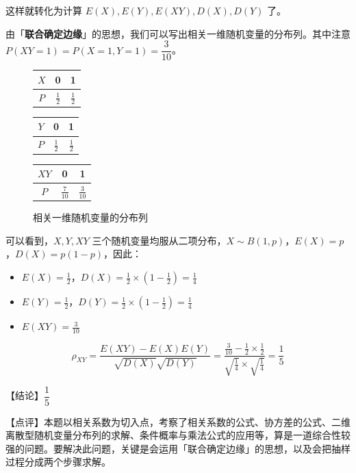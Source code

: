 \documentclass[UTF8]{ctexart}
\begin{document}
这样就转化为计算 $E(X),E(Y),E(XY),D(X),D(Y)$ 了。

由「\textbf{联合确定边缘}」的思想，我们可以写出相关一维随机变量的分布列。其中注意 $P(XY=1) = P(X=1,Y=1) = \dfrac3{10}$。

\begin{figure}[htb]
\begin{minipage}[t]{.32\textwidth}
    \centering
    \begin{tabular}{ccc}
    \toprule
        $X$ & 0 & 1 \\
    \midrule
        $P$ & $\frac12$ & $\frac12$ \\
    \bottomrule
    \end{tabular}
\end{minipage}
\begin{minipage}[t]{.32\textwidth}
    \centering
    \begin{tabular}{ccc}
    \toprule
        $Y$ & 0 & 1 \\
    \midrule
        $P$ & $\frac12$ & $\frac12$ \\
    \bottomrule
    \end{tabular}
\end{minipage}
\begin{minipage}[t]{.32\textwidth}
    \centering
    \begin{tabular}{ccc}
    \toprule
        $XY$ & 0 & 1 \\
    \midrule
        $P$ & $\frac7{10}$ & $\frac3{10}$ \\
    \bottomrule
    \end{tabular}
\end{minipage}
\caption{相关一维随机变量的分布列}
\end{figure}

可以看到，$X,Y,XY$ 三个随机变量均服从二项分布，$X\sim B(1,p)$，$E(X)=p$，$D(X)=p(1-p)$，因此：
\begin{itemize}
  \item $E(X) = \frac12$，$D(X) = \frac12\times(1-\frac12) = \frac14$
  \item $E(Y) = \frac12$，$D(Y) = \frac12\times(1-\frac12) = \frac14$
  \item $E(XY) = \frac3{10}$
\end{itemize}
\begin{equation*}
    \rho_{XY} = \dfrac{E(XY) - E(X)E(Y)}{\sqrt{D(X)}\sqrt{
    D(Y)}} = \dfrac{\frac{3}{10} - \frac12\times\frac12}{\sqrt{\frac14}\times\sqrt{\frac14}} = \dfrac{1}{5}
\end{equation*}

\vspace{1em}
{\color{cyan!80!black} 【结论】$\dfrac{1}{5}$

\vspace{1em}
【点评】本题以相关系数为切入点，考察了相关系数的公式、协方差的公式、二维离散型随机变量分布列的求解、条件概率与乘法公式的应用等，算是一道综合性较强的问题。要解决此问题，关键是会运用「联合确定边缘」的思想，以及会把抽样过程分成两个步骤求解。
}
\end{document}
